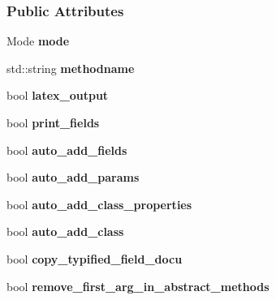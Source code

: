 \subsubsection*{Public Attributes}
\begin{DoxyCompactItemize}
\item 
\hypertarget{struct_run_mode_a795447ab23740374d3066aaa97e4935e}{}Mode {\bfseries mode}\label{struct_run_mode_a795447ab23740374d3066aaa97e4935e}

\item 
\hypertarget{struct_run_mode_ac7bed5cc922d85fd77b279652ca0d533}{}std\+::string {\bfseries methodname}\label{struct_run_mode_ac7bed5cc922d85fd77b279652ca0d533}

\item 
\hypertarget{struct_run_mode_aeee17c152b8b0d49e4b9fe1e0699a2bf}{}bool {\bfseries latex\+\_\+output}\label{struct_run_mode_aeee17c152b8b0d49e4b9fe1e0699a2bf}

\item 
\hypertarget{struct_run_mode_af17cb6d1276b7d51a7e3083a68f92229}{}bool {\bfseries print\+\_\+fields}\label{struct_run_mode_af17cb6d1276b7d51a7e3083a68f92229}

\item 
\hypertarget{struct_run_mode_a6d45fb536adc41066fe78ab514be2137}{}bool {\bfseries auto\+\_\+add\+\_\+fields}\label{struct_run_mode_a6d45fb536adc41066fe78ab514be2137}

\item 
\hypertarget{struct_run_mode_a95648995bc18fd5e64b172a82be62aa9}{}bool {\bfseries auto\+\_\+add\+\_\+params}\label{struct_run_mode_a95648995bc18fd5e64b172a82be62aa9}

\item 
\hypertarget{struct_run_mode_af3b76832df876bca6196e41c8d139225}{}bool {\bfseries auto\+\_\+add\+\_\+class\+\_\+properties}\label{struct_run_mode_af3b76832df876bca6196e41c8d139225}

\item 
\hypertarget{struct_run_mode_ad2387ad85e7a4efe2d9f8117fe3890f7}{}bool {\bfseries auto\+\_\+add\+\_\+class}\label{struct_run_mode_ad2387ad85e7a4efe2d9f8117fe3890f7}

\item 
\hypertarget{struct_run_mode_a525fa2d2020f25d2f4fe0d62251be9b3}{}bool {\bfseries copy\+\_\+typified\+\_\+field\+\_\+docu}\label{struct_run_mode_a525fa2d2020f25d2f4fe0d62251be9b3}

\item 
\hypertarget{struct_run_mode_afd8af9f64353b3353c3e27c527f4b568}{}bool {\bfseries remove\+\_\+first\+\_\+arg\+\_\+in\+\_\+abstract\+\_\+methods}\label{struct_run_mode_afd8af9f64353b3353c3e27c527f4b568}


\end{DoxyCompactItemize}
